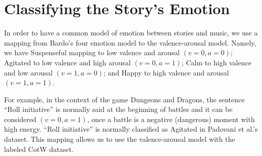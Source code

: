 

\section{Classifying the Story's Emotion}

In order to have a common model of emotion between stories and music,
we use a mapping from Bardo's four emotion model to the valence-arousal model. Namely, we have Suspenseful mapping to low valence and arousal $(v = 0, a = 0)$; Agitated to low valence and high arousal $(v = 0, a = 1)$; Calm to high valence and low arousal $(v = 1, a = 0)$; and Happy to high valence and arousal $(v = 1, a = 1)$.

For example, in the context of the game Dungeons and Dragons, the sentence ``Roll initiative'' is normally said
at the beginning of battles and it can be considered $(v = 0, a = 1)$, once a battle
is a negative (dangerous) moment with high energy. ``Roll initiative'' is normally classified as Agitated in Padovani et al.'s dataset. This mapping allows us to use the valence-arousal model with the labeled CotW dataset.


